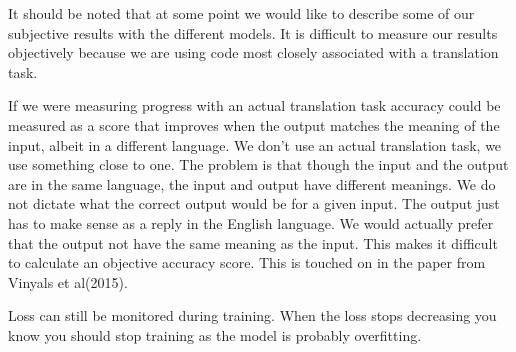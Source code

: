 It should be noted that at some point we would like to describe some of our subjective
results with the different models. It is difficult to measure our results objectively because we
are using code most closely associated with a translation task. 

If we were measuring progress with an actual translation task accuracy could be measured as a score that improves when the output matches the meaning of the input, albeit in a different language. We don't use an actual translation
task, we use something close to one. The problem is that though the input 
and the output are in the same language, the input and output have different meanings. We
do not dictate what the correct output would be for a given input. The output just has to make sense as a reply in the English language. We would actually prefer that the output not have the
same meaning as the input. This makes it difficult to calculate an objective accuracy score. This
is touched on in the paper from Vinyals et al(2015)\cite{DBLP:journals/corr/VinyalsL15}.

Loss can still be monitored during training. When the loss stops decreasing you know you should 
stop training as the model is probably overfitting.

